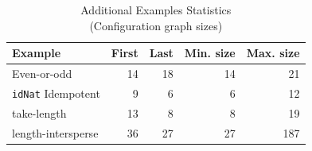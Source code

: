 \documentclass[submission,copyright,creativecommons]{eptcs}
\begin{document}
\begin{table}
  \centering
  \caption{Additional Examples Statistics\\(Configuration graph sizes)}\label{tbl:MoreExamplesStats}
  \begin{tabular}{l|r|r|r|r}
    \hline
    Example                 & First & Last & Min. size & Max. size \\ \hline
    Even-or-odd             &    14 &   18 &        14 &        21 \\
    \verb|idNat| Idempotent &     9 &    6 &         6 &        12 \\
    take-length             &    13 &    8 &         8 &        19 \\
    length-intersperse      &    36 &   27 &        27 &       187 \\
  \end{tabular}
\end{table}
\end{document}
